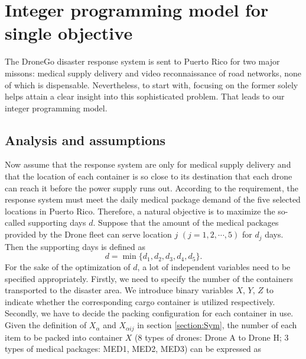 \documentclass{mcmthesis}
\begin{document}
\section{Integer programming model for single objective}

The DroneGo disaster response system is sent to Puerto Rico for two major missons: medical supply delivery and video reconnaissance of road networks, none of which is dispensable. Nevertheless, to start with, focusing on the former solely helps attain a clear insight into this sophisticated problem. That leads to our integer programming model.

\subsection{Analysis and assumptions}

\noindent Now assume that the response system are only for medical supply delivery and that the location of each container is so close to its destination that each drone can reach it before the power supply runs out. According to the requirement, the response system must meet the daily medical package demand of the five selected locations in Puerto Rico. Therefore, a natural objective is to maximize the so-called supporting days $d$. Suppose that the amount of the medical packages provided by the Drone fleet can serve location $j$ $(j=1,2,\cdots,5)$ for $d_j$ days. Then the supporting days is defined as
\begin{equation*}
	d=\min\{d_1,d_2,d_3,d_4,d_5\}.
\end{equation*}
For the sake of the optimization of $d$, a lot of independent variables need to be specified appropriately. Firstly, we need to specify the number of the containers transported to the disaster area. We introduce binary variables $X$, $Y$, $Z$ to indicate whether the corresponding cargo container is utilized respectively. Secondly, we have to decide the packing configuration for each container in use. Given the definition of $X_\alpha$ and $X_{\alpha ij}$ in section \ref{section:Sym}, the number of each item to be packed into container $X$ (8 types of drones: Drone A to Drone H; 3 types of medical packages: MED1, MED2, MED3) can be expressed as
 
\end{document}
